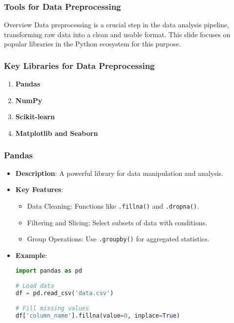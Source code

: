 \documentclass{beamer}
\begin{document}
\begin{frame}
    \frametitle{Tools for Data Preprocessing}
    \begin{block}{Overview}
        Data preprocessing is a crucial step in the data analysis pipeline, transforming raw data into a clean and usable format. This slide focuses on popular libraries in the Python ecosystem for this purpose.
    \end{block}
\end{frame}

\begin{frame}
    \frametitle{Key Libraries for Data Preprocessing}
    \begin{enumerate}
        \item \textbf{Pandas}
        \item \textbf{NumPy}
        \item \textbf{Scikit-learn}
        \item \textbf{Matplotlib and Seaborn}
    \end{enumerate}
\end{frame}

\begin{frame}[fragile]
    \frametitle{Pandas}
    \begin{itemize}
        \item \textbf{Description}: A powerful library for data manipulation and analysis.
        \item \textbf{Key Features}:
            \begin{itemize}
                \item Data Cleaning: Functions like \texttt{.fillna()} and \texttt{.dropna()}.
                \item Filtering and Slicing: Select subsets of data with conditions.
                \item Group Operations: Use \texttt{.groupby()} for aggregated statistics.
            \end{itemize}
        \item \textbf{Example}:
            \begin{lstlisting}[language=Python]
import pandas as pd

# Load data
df = pd.read_csv('data.csv')

# Fill missing values
df['column_name'].fillna(value=0, inplace=True)
            \end{lstlisting}
    \end{itemize}
\end{frame}
\end{document}

